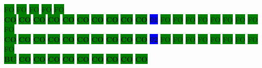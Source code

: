 \colorbox{green}{\color[gray]{0.75}FO}%
\colorbox{green}{\color[gray]{0.75}FO}%
\colorbox{green}{\color[gray]{0.75}FO}%
\colorbox{green}{\color[gray]{0.75}FO}%
\colorbox{green}{\color[gray]{0.75}FO}%
\\
\colorbox{green}{\color[rgb]{0,0,0}\textbf{CO}}%
\colorbox{green}{\color[rgb]{0,0,0}\textbf{CO}}%
\colorbox{green}{\color[rgb]{0,0,0}\textbf{CO}}%
\colorbox{green}{\color[rgb]{0,0,0}\textbf{CO}}%
\colorbox{green}{\color[rgb]{0,0,0}\textbf{CO}}%
\colorbox{green}{\color[rgb]{0,0,0}\textbf{CO}}%
\colorbox{green}{\color[rgb]{0,0,0}\textbf{CO}}%
\colorbox{green}{\color[rgb]{0,0,0}\textbf{CO}}%
\colorbox{green}{\color[rgb]{0,0,0}\textbf{CO}}%
\colorbox{green}{\color[rgb]{0,0,0}\textbf{CO}}%
\colorbox{blue}{\color[rgb]{1,0,0}\textbf{01}}%
\colorbox{green}{\color[gray]{0.75}FO}%
\colorbox{green}{\color[gray]{0.75}FO}%
\colorbox{green}{\color[gray]{0.75}FO}%
\colorbox{green}{\color[gray]{0.75}FO}%
\colorbox{green}{\color[gray]{0.75}FO}%
\colorbox{green}{\color[gray]{0.75}FO}%
\colorbox{green}{\color[gray]{0.75}FO}%
\colorbox{green}{\color[gray]{0.75}FO}%
\colorbox{green}{\color[gray]{0.75}FO}%
\\
\colorbox{green}{\color[rgb]{0,0,0}\textbf{CO}}%
\colorbox{green}{\color[rgb]{0,0,0}\textbf{CO}}%
\colorbox{green}{\color[rgb]{0,0,0}\textbf{CO}}%
\colorbox{green}{\color[rgb]{0,0,0}\textbf{CO}}%
\colorbox{green}{\color[rgb]{0,0,0}\textbf{CO}}%
\colorbox{green}{\color[rgb]{0,0,0}\textbf{CO}}%
\colorbox{green}{\color[rgb]{0,0,0}\textbf{CO}}%
\colorbox{green}{\color[rgb]{0,0,0}\textbf{CO}}%
\colorbox{green}{\color[rgb]{0,0,0}\textbf{CO}}%
\colorbox{green}{\color[rgb]{0,0,0}\textbf{CO}}%
\colorbox{blue}{\color[rgb]{1,0,0}\textbf{02}}%
\colorbox{green}{\color[gray]{0.75}FO}%
\colorbox{green}{\color[gray]{0.75}FO}%
\colorbox{green}{\color[gray]{0.75}FO}%
\colorbox{green}{\color[gray]{0.75}FO}%
\colorbox{green}{\color[gray]{0.75}FO}%
\colorbox{green}{\color[gray]{0.75}FO}%
\colorbox{green}{\color[gray]{0.75}FO}%
\colorbox{green}{\color[gray]{0.75}FO}%
\colorbox{green}{\color[gray]{0.75}FO}%
\\
\colorbox{green}{\color[rgb]{1,0,0}\textbf{BU}}%
\colorbox{green}{\color[rgb]{0,0,0}\textbf{CO}}%
\colorbox{green}{\color[rgb]{0,0,0}\textbf{CO}}%
\colorbox{green}{\color[rgb]{0,0,0}\textbf{CO}}%
\colorbox{green}{\color[rgb]{0,0,0}\textbf{CO}}%
\colorbox{green}{\color[rgb]{0,0,0}\textbf{CO}}%
\colorbox{green}{\color[rgb]{0,0,0}\textbf{CO}}%
\colorbox{green}{\color[rgb]{0,0,0}\textbf{CO}}%
\colorbox{green}{\color[rgb]{0,0,0}\textbf{CO}}%
\colorbox{green}{\color[rgb]{0,0,0}\textbf{CO}}%
